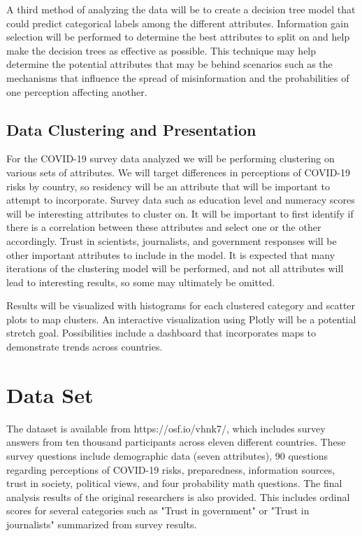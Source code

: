 \documentclass[11pt,sigconf]{acmart}
\begin{document}
A third method of analyzing the data will be to create a decision tree model that could predict categorical labels among the different attributes. Information gain selection will be performed to determine the best attributes to split on and help make the decision trees as effective as possible. This technique may help determine the potential attributes that may be behind scenarios such as the mechanisms that influence the spread of misinformation and the probabilities of one perception affecting another.

\subsection{Data Clustering and Presentation}

For the COVID-19 survey data analyzed we will be performing clustering on various sets of attributes. We will target differences in perceptions of COVID-19 risks by country, so residency will be an attribute that will be important to attempt to incorporate. Survey data such as education level and numeracy scores will be interesting attributes to cluster on. It will be important to first identify if there is a correlation between these attributes and select one or the other accordingly. Trust in scientists, journalists, and government responses will be other important attributes to include in the model. It is expected that many iterations of the clustering model will be performed, and not all attributes will lead to interesting results, so some may ultimately be omitted. 

Results will be visualized with histograms for each clustered category and scatter plots to map clusters. An interactive visualization using Plotly will be a potential stretch goal. Possibilities include a dashboard that incorporates maps to demonstrate trends across countries.

\section{Data Set}

The dataset is available from https://osf.io/vhnk7/, which includes survey answers from ten thousand participants across eleven different countries. These survey questions include demographic data (seven attributes), 90 questions regarding perceptions of COVID-19 risks, preparedness, information sources, trust in society, political views, and four probability math questions. The final analysis results of the original researchers is also provided. This includes ordinal scores for several categories such as "Trust in government" or "Trust in journalists" summarized from survey results. 
\end{document}

